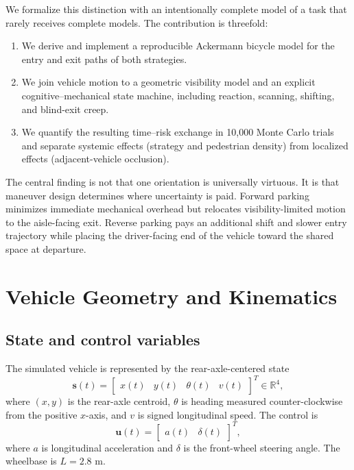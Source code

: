 \documentclass[11pt]{article}
\newcommand{\RR}{\mathbb{R}}
\newcommand{\vect}[1]{\boldsymbol{#1}}
\begin{document}
We formalize this distinction with an intentionally complete model of a task that rarely receives complete models. The contribution is threefold:
\begin{enumerate}[leftmargin=1.6em]
  \item We derive and implement a reproducible Ackermann bicycle model for the entry and exit paths of both strategies.
  \item We join vehicle motion to a geometric visibility model and an explicit cognitive--mechanical state machine, including reaction, scanning, shifting, and blind-exit creep.
  \item We quantify the resulting time--risk exchange in 10,000 Monte Carlo trials and separate systemic effects (strategy and pedestrian density) from localized effects (adjacent-vehicle occlusion).
\end{enumerate}

The central finding is not that one orientation is universally virtuous. It is that maneuver design determines where uncertainty is paid. Forward parking minimizes immediate mechanical overhead but relocates visibility-limited motion to the aisle-facing exit. Reverse parking pays an additional shift and slower entry trajectory while placing the driver-facing end of the vehicle toward the shared space at departure.

\section{Vehicle Geometry and Kinematics}

\subsection{State and control variables}

The simulated vehicle is represented by the rear-axle-centered state
\begin{equation}
  \vect{s}(t)=\begin{bmatrix}x(t)&y(t)&\theta(t)&v(t)\end{bmatrix}^{\!T}\in\RR^4,
\end{equation}
where $(x,y)$ is the rear-axle centroid, $\theta$ is heading measured counter-clockwise from the positive $x$-axis, and $v$ is signed longitudinal speed. The control is
\begin{equation}
  \vect{u}(t)=\begin{bmatrix}a(t)&\delta(t)\end{bmatrix}^{\!T},
\end{equation}
where $a$ is longitudinal acceleration and $\delta$ is the front-wheel steering angle. The wheelbase is $L=2.8$ m.
\end{document}
